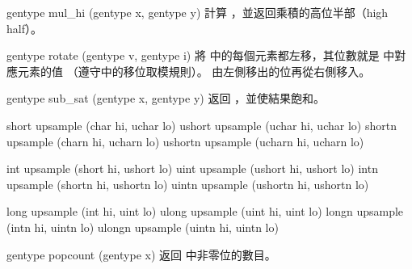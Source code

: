 gentype mul_hi (gentype x,
		gentype y)
\stopbuffer
{}
計算 ，並返回乘積的高位半部（high half）。
\stopbuffer

gentype rotate (gentype v, gentype i)
\stopbuffer
{}
將  中的每個元素都左移，其位數就是  中對應元素的值
（遵守中的移位取模規則）。
由左側移出的位再從右側移入。
\stopbuffer

gentype sub_sat (gentype x, gentype y)
\stopbuffer
{}
返回 ，並使結果飽和。
\stopbuffer

short upsample (char hi, uchar lo)
ushort upsample (uchar hi, uchar lo)
shortn upsample (charn hi, ucharn lo)
ushortn upsample (ucharn hi, ucharn lo)
\stopbuffer
{}
\par
{}
\stopbuffer
{}
int upsample (short hi, ushort lo)
uint upsample (ushort hi, ushort lo)
intn upsample (shortn hi, ushortn lo)
uintn upsample (ushortn hi, ushortn lo)
\stopbuffer
{}
\par
{}
\stopbuffer
{}
long upsample (int hi, uint lo)
ulong upsample (uint hi, uint lo)
longn upsample (intn hi, uintn lo)
ulongn upsample (uintn hi, uintn lo)
\stopbuffer
{}
\par
{}
\stopbuffer

gentype popcount (gentype x)
\stopbuffer
{}
返回  中非零位的數目。
\stopbuffer

\startCLFD


\stopCLFD

